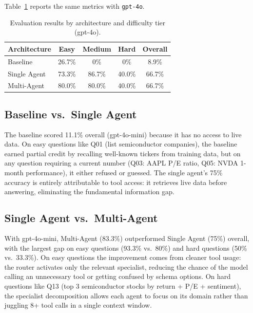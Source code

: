 \documentclass[conference]{IEEEtran}
\begin{document}
Table~\ref{tab:large} reports the same metrics with \texttt{gpt-4o}.

\begin{table}[H]
\centering
\caption{Evaluation results by architecture and difficulty tier (gpt-4o).}
\label{tab:large}
\begin{tabular}{lcccc}
\toprule
\textbf{Architecture} & \textbf{Easy} & \textbf{Medium} & \textbf{Hard} & \textbf{Overall} \\
\midrule
Baseline      & 26.7\% & 0\%    & 0\%    & 8.9\% \\
Single Agent  & 73.3\% & 86.7\% & 40.0\% & 66.7\% \\
Multi-Agent   & 80.0\% & 80.0\% & 40.0\% & 66.7\% \\
\bottomrule
\end{tabular}
\end{table}

\subsection{Baseline vs.\ Single Agent}

The baseline scored 11.1\% overall (gpt-4o-mini) because it has no access to live data.
On easy questions like Q01 (list semiconductor companies), the baseline earned partial
credit by recalling well-known tickers from training data, but on any question requiring
a current number (Q03: AAPL P/E ratio, Q05: NVDA 1-month performance), it either refused
or guessed.  The single agent's 75\% accuracy is entirely attributable to tool access:
it retrieves live data before answering, eliminating the fundamental information gap.

\subsection{Single Agent vs.\ Multi-Agent}

With gpt-4o-mini, Multi-Agent (83.3\%) outperformed Single Agent (75\%) overall,
with the largest gap on easy questions (93.3\% vs.\ 80\%) and hard questions
(50\% vs.\ 33.3\%).  On easy questions the improvement comes from cleaner tool usage:
the router activates only the relevant specialist, reducing the chance of the model
calling an unnecessary tool or getting confused by schema options.  On hard questions
like Q13 (top 3 semiconductor stocks by return + P/E + sentiment), the specialist
decomposition allows each agent to focus on its domain rather than juggling 8+ tool
calls in a single context window.
\end{document}
